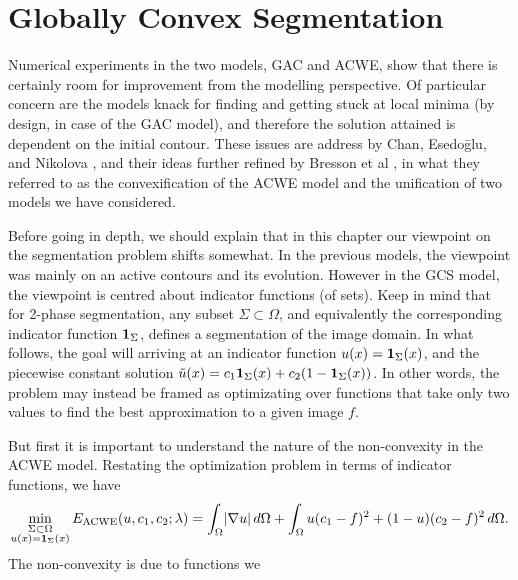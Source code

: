 \chapter{Globally Convex Segmentation}
Numerical experiments in the two models, GAC and ACWE, show that there is certainly room for improvement from the modelling perspective. Of particular concern are the models knack for finding and getting stuck at local minima (by design, in case of the GAC model), and therefore the solution attained is dependent on the initial contour. These issues are address by Chan, Esedo\={g}lu, and Nikolova \cite{chan2006algorithms}, and their ideas further refined by Bresson et al \cite{bresson2007fast}, in what they referred to as the convexification of the ACWE model and the unification of two models we have considered.

Before going in depth, we should explain that in this chapter our viewpoint on the segmentation problem shifts somewhat. In the previous models, the viewpoint was mainly on an active contours and its evolution. However in the GCS model, the viewpoint is centred about indicator functions (of sets). Keep in mind that for 2-phase segmentation, any subset $\Sigma \subset \Omega$, and equivalently the corresponding indicator function $\mathbf{1}_\Sigma$, defines a segmentation of the image domain. In what follows, the goal will arriving at an indicator function $u(x) = \mathbf{1}_\Sigma(x)$, and the piecewise constant solution $\tilde u(x) = c_1 \mathbf{1}_\Sigma(x) + c_2 (1 - \mathbf{1}_\Sigma(x))$. In other words, the problem may instead be framed as optimizating over functions that take only two values to find the best approximation to a given image $f$.

But first it is important to understand the nature of the non-convexity in the ACWE model. Restating the optimization problem in terms of indicator functions, we have 
\begin{align*}
\min_{\substack{\Sigma\subset\Omega \\ 
		u(x) = \mathbf{1}_\Sigma(x)}} E_\textrm{ACWE}(u, c_1, c_2; \lambda)
= \int_{\Omega} \lvert\nabla u\rvert \,d\Omega 
+ \int_\Omega u(c_1 - f)^2   + (1-u)(c_2 - f)^2 \,d\Omega .
\end{align*}
The non-convexity is due to functions we 



